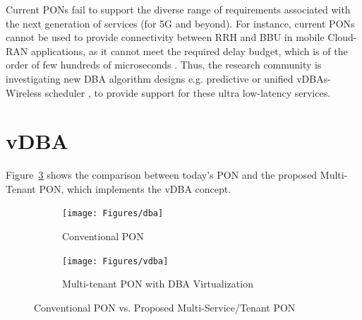 Current \acp{PON} fail to support the diverse range of requirements associated with the next generation of services (for 5G and beyond). For instance, current \acp{PON} cannot be used to provide connectivity between \ac{RRH} and \ac{BBU} in mobile Cloud-RAN applications, as it cannot meet the required delay budget, which is of the order of few hundreds of microseconds \cite{Zhou:18}. %
Thus, the research community is investigating new \ac{DBA} algorithm designs e.g. predictive \cite{8289443} or unified \acp{vDBA}-Wireless scheduler \cite{Zhou:18}, to provide support for these ultra low-latency services.


\section{\acf{vDBA} }

Figure~\ref{DBAvsVDBA} shows the comparison between today's \ac{PON} and the proposed Multi-Tenant \ac{PON}, which implements the \ac{vDBA} concept.

\begin{figure}[h]
\centering
\begin{subfigure}{0.41\columnwidth}
 \texttt{[image: Figures/dba]}
\caption{Conventional \ac{PON}}%
\label{dba}
\end{subfigure}\hfill%
\begin{subfigure}{0.59\columnwidth}
 \texttt{[image: Figures/vdba]}
\caption{Multi-tenant \ac{PON} with \ac{DBA} Virtualization}%
\label{vdba}
\end{subfigure}\hfill%
\caption{Conventional \ac{PON} vs. Proposed Multi-Service/Tenant \ac{PON}}
\label{DBAvsVDBA}%
\end{figure}


